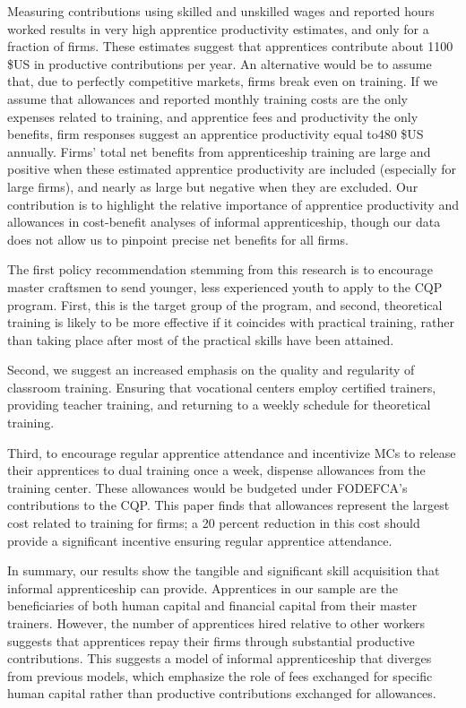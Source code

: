 \documentclass[
  11pt,
a4paper
]{report}
\begin{document}
Measuring contributions using skilled and unskilled wages and reported hours worked results in very high apprentice productivity estimates, and only for a fraction of firms. These estimates suggest that apprentices contribute about 1100 \$US in productive contributions per year. An alternative would be to assume that, due to perfectly competitive markets, firms break even on training. If we assume that allowances and reported monthly training costs are the only expenses related to training, and apprentice fees and productivity the only benefits, firm responses suggest an apprentice productivity equal to480 \$US annually. Firms' total net benefits from apprenticeship training are large and positive when these estimated apprentice productivity are included (especially for large firms), and nearly as large but negative when they are excluded. Our contribution is to highlight the relative importance of apprentice productivity and allowances in cost-benefit analyses of informal apprenticeship, though our data does not allow us to pinpoint precise net benefits for all firms.

The first policy recommendation stemming from this research is to encourage master craftsmen to send younger, less experienced youth to apply to the CQP program. First, this is the target group of the program, and second, theoretical training is likely to be more effective if it coincides with practical training, rather than taking place after most of the practical skills have been attained.

Second, we suggest an increased emphasis on the quality and regularity of classroom training. Ensuring that vocational centers employ certified trainers, providing teacher training, and returning to a weekly schedule for theoretical training.

Third, to encourage regular apprentice attendance and incentivize MCs to release their apprentices to dual training once a week, dispense allowances from the training center. These allowances would be budgeted under FODEFCA's contributions to the CQP. This paper finds that allowances represent the largest cost related to training for firms; a 20 percent reduction in this cost should provide a significant incentive ensuring regular apprentice attendance.

In summary, our results show the tangible and significant skill acquisition that informal apprenticeship can provide. Apprentices in our sample are the beneficiaries of both human capital and financial capital from their master trainers. However, the number of apprentices hired relative to other workers suggests that apprentices repay their firms through substantial productive contributions. This suggests a model of informal apprenticeship that diverges from previous models, which emphasize the role of fees exchanged for specific human capital rather than productive contributions exchanged for allowances.
\end{document}
